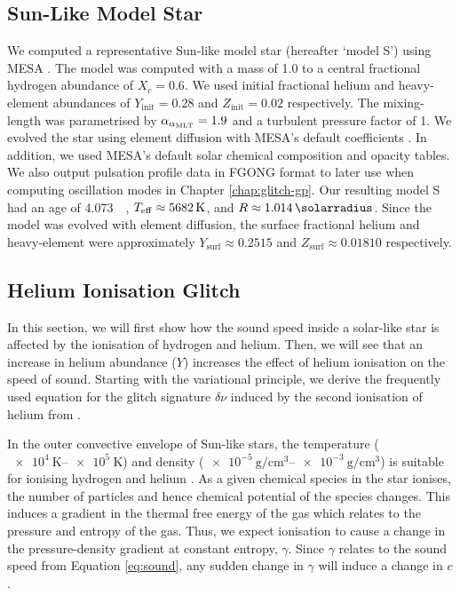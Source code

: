 \subsection{Sun-Like Model Star}\label{sec:model-s}

We computed a representative Sun-like model star (hereafter `model S') using MESA \citep[version 12115;][]{Paxton.Bildsten.ea2011,Paxton.Cantiello.ea2013,Paxton.Marchant.ea2015,Paxton.Schwab.ea2018,Paxton.Smolec.ea2019,Jermyn.Bauer.ea2023}. The model was computed with a mass of \SI{1.0}{\solarmass} to a central fractional hydrogen abundance of \(X_c=0.6\). We used initial fractional helium and heavy-element abundances of \(Y_\mathrm{init} = 0.28\) and \(Z_\mathrm{init}=0.02\) respectively. The mixing-length was parametrised by \(\alpha_{{\alpha_\mathrm{MLT}}}=1.9\) and a turbulent pressure factor of 1. We evolved the star using element diffusion with MESA's default coefficients \citep{Stanton.Murillo2016}. In addition, we used MESA's default \citet{Grevesse.Sauval1998} solar chemical composition and opacity tables. We also output pulsation profile data in FGONG format to later use when computing oscillation modes in Chapter \ref{chap:glitch-gp}. Our resulting model S had an age of \SI{4.073}{\giga\year}, \({T_\mathrm{eff}} \approx \SI{5682}{\kelvin}\), and \(R \approx \SI{1.014}{\solarradius}\). Since the model was evolved with element diffusion, the surface fractional helium and heavy-element were approximately \(Y_\mathrm{surf} \approx 0.2515\) and \(Z_\mathrm{surf} \approx 0.01810\) respectively.

\subsection{Helium Ionisation Glitch}\label{sec:helium-glitch}

In this section, we will first show how the sound speed inside a solar-like star is affected by the ionisation of hydrogen and helium. Then, we will see that an increase in helium abundance (\(Y\)) increases the effect of helium ionisation on the speed of sound. Starting with the variational principle, we derive the frequently used equation for the glitch signature \(\delta\nu\) induced by the second ionisation of helium from \citet{Houdek.Gough2007}.

In the outer convective envelope of Sun-like stars, the temperature (\(\SIrange{e4}{e5}{\kelvin}\)) and density (\(\SIrange{e-5}{e-3}{\gram\per\centi\metre\cubed}\)) is suitable for ionising hydrogen and helium \citep{Eggleton.Faulkner.ea1973}. As a given chemical species in the star ionises, the number of particles and hence chemical potential of the species changes. This induces a gradient in the thermal free energy of the gas which relates to the pressure and entropy of the gas. Thus, we expect ionisation to cause a change in the pressure-density gradient at constant entropy, \(\gamma\). Since \(\gamma\) relates to the sound speed from Equation \ref{eq:sound}, any sudden change in \(\gamma\) will induce a change in \(c\).

